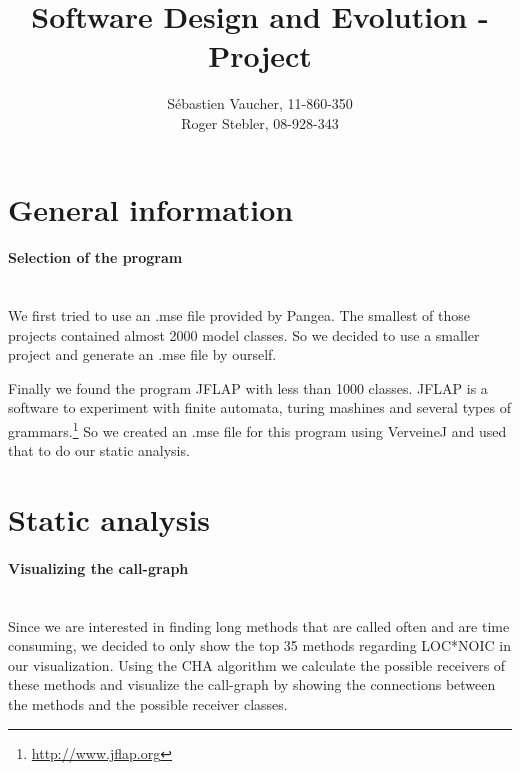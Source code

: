 \documentclass{paper}
\title{Software Design and Evolution - Project}
\author{S\'{e}bastien Vaucher, 11-860-350\\Roger Stebler, 08-928-343}
\begin{document}
\maketitle


%

\section{General information}

\paragraph{Selection of the program}\mbox{}\vspace{10pt}\\
We first tried to use an .mse file provided by Pangea. The smallest of those projects contained almost 2000 model classes. So we decided to use a smaller project and generate an .mse file by ourself.


Finally we found the program JFLAP with less than 1000 classes. JFLAP is a software to experiment with finite automata, turing mashines and several types of grammars.\footnote{\url{http://www.jflap.org}} So we created an .mse file for this program using VerveineJ and used that to do our static analysis.


\section{Static analysis}

\paragraph{Visualizing the call-graph}\mbox{}\vspace{10pt}\\
Since we are interested in finding long methods that are called often and are time consuming, we decided to only show the top 35 methods regarding LOC*NOIC in our visualization. Using the CHA algorithm we calculate the possible receivers of these methods and visualize the call-graph by showing the connections between the methods and the possible receiver classes.
\end{document}
